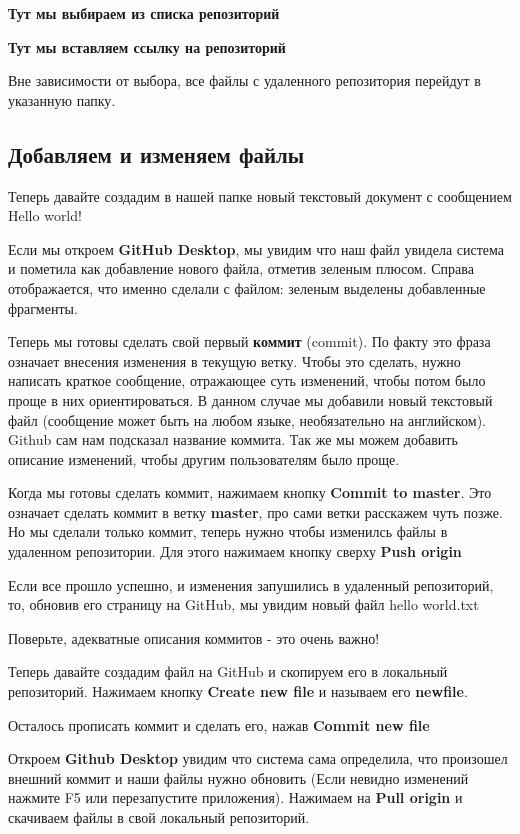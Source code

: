 \documentclass[11pt]{article}
\begin{document}
\textbf{Тут мы выбираем из списка репозиторий}

\textbf{Тут мы вставляем ссылку на репозиторий}

Вне зависимости от выбора, все файлы с удаленного репозитория перейдут в
указанную папку.

    \subsection{Добавляем и изменяем
файлы}\label{ux434ux43eux431ux430ux432ux43bux44fux435ux43c-ux438-ux438ux437ux43cux435ux43dux44fux435ux43c-ux444ux430ux439ux43bux44b}

Теперь давайте создадим в нашей папке новый текстовый документ с
сообщением Hello world!

Если мы откроем \textbf{GitHub Desktop}, мы увидим что наш файл увидела
система и пометила как добавление нового файла, отметив зеленым плюсом.
Справа отображается, что именно сделали с файлом: зеленым выделены
добавленные фрагменты.

Теперь мы готовы сделать свой первый \textbf{коммит} (commit). По факту
это фраза означает внесения изменения в текущую ветку. Чтобы это
сделать, нужно написать краткое сообщение, отражающее суть изменений,
чтобы потом было проще в них ориентироваться. В данном случае мы
добавили новый текстовый файл (сообщение может быть на любом языке,
необязательно на английском). Github сам нам подсказал название коммита.
Так же мы можем добавить описание изменений, чтобы другим пользователям
было проще.

Когда мы готовы сделать коммит, нажимаем кнопку \textbf{Commit to
master}. Это означает сделать коммит в ветку \textbf{master}, про сами
ветки расскажем чуть позже. Но мы сделали только коммит, теперь нужно
чтобы изменилсь файлы в удаленном репозитории. Для этого нажимаем кнопку
сверху \textbf{Push origin}

Если все прошло успешно, и изменения запушились в удаленный репозиторий,
то, обновив его страницу на GitHub, мы увидим новый файл hello world.txt

Поверьте, адекватные описания коммитов - это очень важно!

    Теперь давайте создадим файл на GitHub и скопируем его в локальный
репозиторий. Нажимаем кнопку \textbf{Create new file} и называем его
\textbf{newfile}.

Осталось прописать коммит и сделать его, нажав \textbf{Commit new file}

Откроем \textbf{Github Desktop} увидим что система сама определила, что
произошел внешний коммит и наши файлы нужно обновить (Если невидно
изменений нажмите F5 или перезапустите приложения). Нажимаем на
\textbf{Pull origin} и скачиваем файлы в свой локальный репозиторий.
\end{document}
